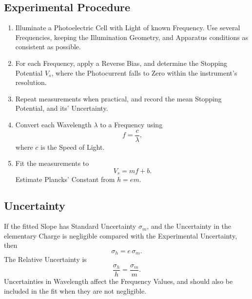 \documentclass[a4paper, 10pt, onepage]{elegantbook}
\begin{document}
{

\subsection{Experimental Procedure}

\begin{enumerate}
  \item Illuminate a Photoelectric Cell with Light of known Frequency. Use several Frequencies, keeping the 
Illumination Geometry, and
  Apparatus conditions as consistent as possible.
  \item For each Frequency, apply a Reverse Bias, and determine the
  Stopping Potential \(V_s\), where the Photocurrent falls to Zero
  within the instrument's resolution.
  \item Repeat measurements when practical, and record the mean
  Stopping Potential, and its' Uncertainty.
  \item Convert each Wavelength \(\lambda\) to a Frequency using
  \[
  f=\frac{c}{\lambda},
  \]
  where \(c\) is the Speed of Light.
  \item Fit the measurements to
  \[
  V_s=mf+b.
  \]
  Estimate Plancks' Constant from \(h=em\).
\end{enumerate}

\subsection{Uncertainty}

If the fitted Slope has Standard Uncertainty \(\sigma_m\), and the Uncertainty in the elementary Charge is negligible 
compared with the Experimental Uncertainty, then
\[
\sigma_h=e\,\sigma_m.
\]
The Relative Uncertainty is
\[
\frac{\sigma_h}{h}=\frac{\sigma_m}{m}.
\]
Uncertainties in Wavelength affect the Frequency Values, and should also be included in the fit when they are not 
negligible.

}
\end{document}
